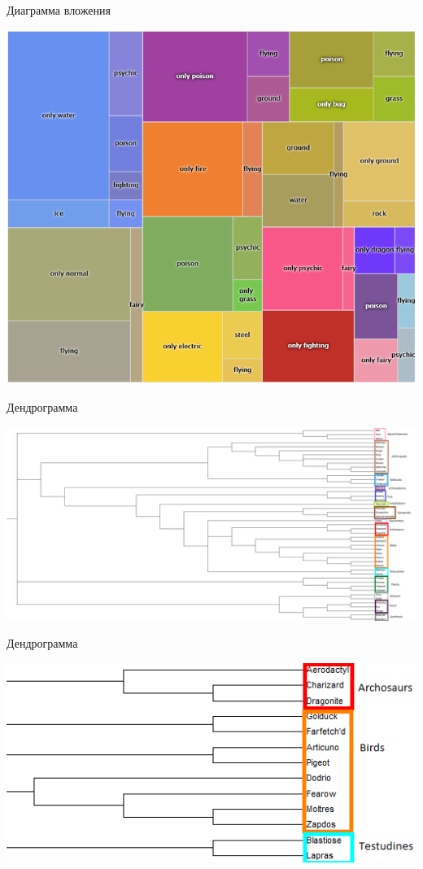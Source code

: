 \documentclass[10pt]{beamer}
\begin{document}
{
\begin{frame}{Диаграмма вложения}
  \begin{center}
    \includegraphics[height=0.8 \textheight, keepaspectratio = true]{images/diagram}    
  \end{center}
\end{frame}
}

\begin{frame}{Дендрограмма}
  \begin{center}
    \includegraphics[height=\textheight, width=\textwidth, keepaspectratio = true]{images/dendrogram}    
  \end{center}
\end{frame}

\begin{frame}{Дендрограмма}
  \begin{center}
    \includegraphics[height=0.8 \textheight, width=0.8 \textwidth, keepaspectratio = true]{images/dendrogram1}    
  \end{center}
\end{frame}
\end{document}

